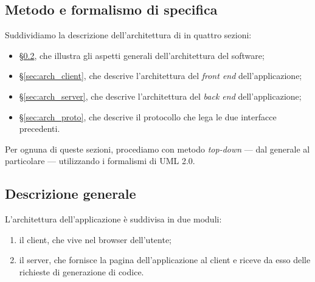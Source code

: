 


\subsection{Metodo e formalismo di specifica}
Suddividiamo la descrizione dell'architettura di \proj{} in quattro sezioni:
\begin{itemize}
	\item §\ref{sec:arch_gen}, che illustra gli aspetti generali dell'architettura del software;
	\item §\ref{sec:arch_client}, che descrive l'architettura del \emph{front end} dell'applicazione;
	\item §\ref{sec:arch_server}, che descrive l'architettura del \emph{back end} dell'applicazione;
	\item §\ref{sec:arch_proto}, che descrive il protocollo che lega le due interfacce precedenti.
\end{itemize}
Per ognuna di queste sezioni, procediamo con metodo \emph{top-down} --- dal generale al particolare --- utilizzando i formalismi di UML 2.0.



\subsection{Descrizione generale} \label{sec:arch_gen}
L'architettura dell'applicazione è suddivisa in due moduli:
\begin{enumerate}
	\item il client, che vive nel browser dell'utente;
	\item il server, che fornisce la pagina dell'applicazione al client e riceve da esso delle richieste di generazione di codice.
\end{enumerate}

